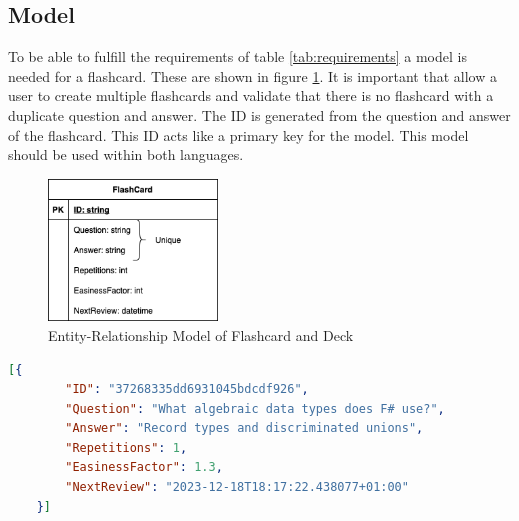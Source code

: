     \subsection{Model}
    To be able to fulfill the requirements of table \ref{tab:requirements} a model is needed for a flashcard. These are shown in figure \ref{fig:model}. It is important that allow a user to create multiple flashcards and validate that there is no flashcard with a duplicate question and answer. The ID is generated from the question and answer of the flashcard. This ID acts like a primary key for the model. This model should be used within both languages.

    \begin{figure}
        \centering
        \includegraphics[width=0.4\textwidth]{NerddeckModel.png}
        \caption{Entity-Relationship Model of Flashcard and Deck}\label{fig:model}
    \end{figure}

    \begin{lstlisting}[language=json,firstnumber=1,float=tp, caption={Example of how a flashcard is saved inside a \ac{json} file}, label=l:flashcardjson]
    [{
        "ID": "37268335dd6931045bdcdf926",
        "Question": "What algebraic data types does F# use?",
        "Answer": "Record types and discriminated unions",
        "Repetitions": 1,
        "EasinessFactor": 1.3,
        "NextReview": "2023-12-18T18:17:22.438077+01:00"
    }]   
    \end{lstlisting}

